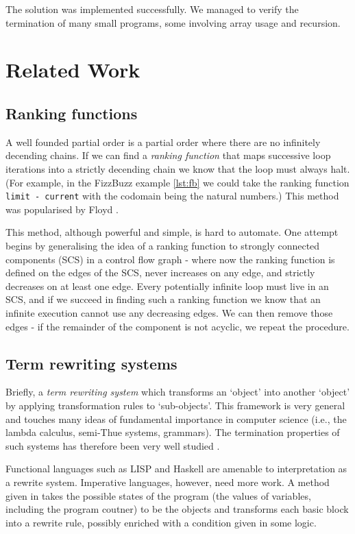 \documentclass[12pt,a4paper]{article}
\begin{document}
The solution was implemented successfully. We managed to verify the termination of many small programs, some involving array usage and recursion.

\section{Related Work}
\subsection{Ranking functions}
A well founded partial order is a partial order where there are no infinitely decending chains. If we can find a \emph{ranking function} that maps successive loop iterations into a strictly decending chain we know that the loop must always halt. (For example, in the FizzBuzz example \cref{lst:fb} we could take the ranking function \texttt{limit - current} with the codomain being the natural numbers.) This method was popularised by Floyd \citep{assigning meanings to programs}.

This method, although powerful and simple, is hard to automate. One attempt \citep{colon} begins by generalising the idea of a ranking function to strongly connected components (SCS) in a control flow graph - where now the ranking function is defined on the edges of the SCS, never increases on any edge, and strictly decreases on at least one edge. Every potentially infinite loop must live in an SCS, and if we succeed in finding such a ranking function we know that an infinite execution cannot use any decreasing edges. We can then remove those edges - if the remainder of the component is not acyclic, we repeat the procedure.

\subsection{Term rewriting systems}
Briefly, a \emph{term rewriting system} which transforms an `object' into another `object' by applying transformation rules to `sub-objects'. This framework is very general and touches many ideas of fundamental importance in computer science (i.e., the lambda calculus, semi-Thue systems, grammars). The termination properties of such systems has therefore been very well studied \cite{Zantema, term rewrite systems, p181}.

Functional languages such as LISP and Haskell are amenable to interpretation as a rewrite system. Imperative languages, however, need more work. A method given in \citep{A Term Rewriting Approach to the Automated Termination Analysis of Imperative Programs} takes the possible states of the program (the values of variables, including the program coutner) to be the objects and transforms each basic block into a rewrite rule, possibly enriched with a condition given in some logic.
\end{document}
